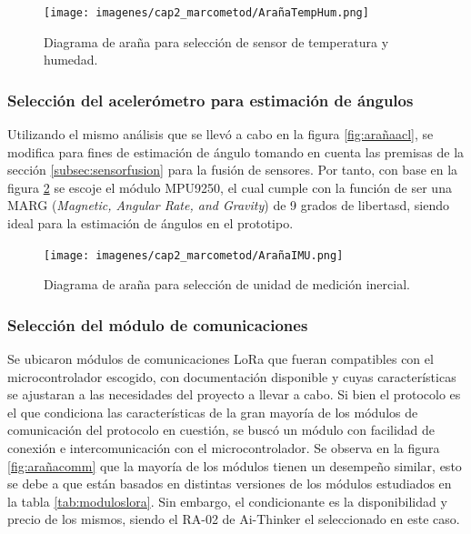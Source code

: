 \begin{figure}[H]
    \centering
    \texttt{[image: imagenes/cap2\_marcometod/ArañaTempHum.png]}
    \caption{Diagrama de araña para selección de sensor de temperatura y humedad.}
    \label{fig:arañatemphum}
\end{figure}

\subsubsection{Selección del acelerómetro para estimación de ángulos}

Utilizando el mismo análisis que se llevó a cabo en la figura \ref{fig:arañaacl}, se modifica para fines de estimación de ángulo tomando en cuenta las premisas de la sección \ref{subsec:sensorfusion} para la fusión de sensores. Por tanto, con base en la figura \ref{fig:arañaimu} se escoje el módulo MPU9250, el cual cumple con la función de ser una MARG (\textit{Magnetic, Angular Rate, and Gravity}) de 9 grados de libertasd, siendo ideal para la estimación de ángulos en el prototipo.

\begin{figure}[H]
    \centering
    \texttt{[image: imagenes/cap2\_marcometod/ArañaIMU.png]}
    \caption{Diagrama de araña para selección de unidad de medición inercial.}
    \label{fig:arañaimu}
\end{figure}



\subsubsection{Selección del módulo de comunicaciones}

Se ubicaron módulos de comunicaciones LoRa que fueran compatibles con el microcontrolador escogido, con documentación disponible y cuyas características se ajustaran a las necesidades del proyecto a llevar a cabo. Si bien el protocolo es el que condiciona las características de la gran mayoría de los módulos de comunicación del protocolo en cuestión, se buscó un módulo con facilidad de conexión e intercomunicación con el microcontrolador. Se observa en la figura \ref{fig:arañacomm} que la mayoría de los módulos tienen un desempeño similar, esto se debe a que están basados en distintas versiones de los módulos estudiados en la tabla \ref{tab:moduloslora}. Sin embargo, el condicionante es la disponibilidad y precio de los mismos, siendo el RA-02 de Ai-Thinker el seleccionado en este caso.

